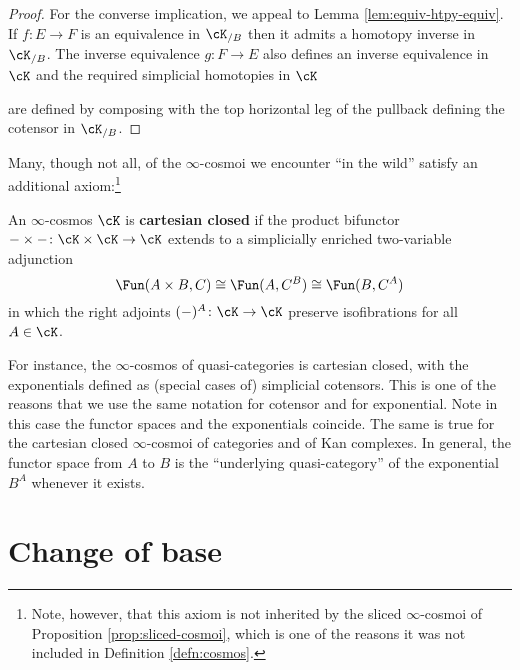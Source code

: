 \begin{proof}
For the converse implication, we appeal to  Lemma \ref{lem:equiv-htpy-equiv}. If $f \colon E \to F$ is an equivalence in $\cK_{/B}$ then it admits a homotopy inverse in $\cK_{/B}$. The inverse equivalence $g \colon F \to E$ also defines an inverse equivalence in $\cK$ and the required simplicial homotopies in $\cK$
\begin{center}
\end{center}
are defined by composing with the top horizontal leg of the pullback defining the cotensor in $\cK_{/B}$.
\end{proof}

Many, though not all, of the $\infty$-cosmoi we encounter ``in the wild'' satisfy an additional axiom:\footnote{Note, however, that this axiom is not inherited by the sliced $\infty$-cosmoi of Proposition \ref{prop:sliced-cosmoi}, which is one of the reasons it was not included in Definition \ref{defn:cosmos}.}

\begin{definition}\label{defn:closed-cosmos}
   An $\infty$-cosmos $\cK$ is \textbf{cartesian closed} if the product bifunctor
$- \times -\colon \cK \times \cK \to \cK$ extends to a simplicially enriched two-variable adjunction
\[ \Fun(A \times B,C) \cong \Fun(A,C^B) \cong \Fun(B,C^A)\]
in which the right adjoints $(-)^A \colon \cK \to \cK$ preserve isofibrations for all $A \in \cK$.
\end{definition}

For instance, the $\infty$-cosmos of quasi-categories is cartesian closed, with the exponentials defined as (special cases of) simplicial cotensors. This is one of the reasons that we use the same notation for cotensor and for exponential. Note in this case the functor spaces and the exponentials coincide. The same is true for the cartesian closed $\infty$-cosmoi of categories and of Kan complexes. In general, the functor space from $A$ to $B$ is the ``underlying quasi-category'' of the exponential $B^A$ whenever it exists. %

\section{Change of base}\label{sec:change-of-base}


